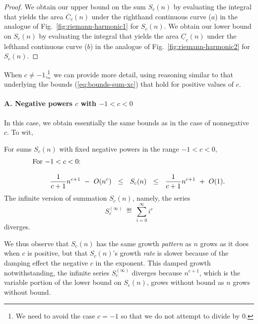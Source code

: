 \begin{proof}
We obtain our upper bound on the sum $S_c(n)$ by evaluating the
integral that yields the area $\overline{C}_c(n)$ under the righthand
continuous curve ($a$) in the analogue of
Fig.~\ref{fig:riemann-harmonic1} for $S_c(n)$.  We obtain our lower
bound on $S_c(n)$ by evaluating the integral that yields the area
$\underline{C}_c(n)$ under the lefthand continuous curve ($b$) in the
analogue of Fig.~\ref{fig:riemann-harmonic2} for $S_c(n)$.
\end{proof}

When $c \neq -1$,\footnote{We need to avoid the case $c = -1$ so that
  we do not attempt to divide by $0$.}~we can provide more detail,
using reasoning similar to that underlying the bounds
(\ref{eq:bounds-sum-xc}) that hold for positive values of $c$.

\paragraph{\sf A. Negative powers $c$ with $-1 < c < 0$}
In this case, we obtain essentially the same bounds as in the case of
nonnegative $c$.  To wit,

\begin{prop}
\label{thm:bounds-(-1)<c<0}
For sums $S_c(n)$ with fixed negative powers in the range $-1 < c<0$,
\begin{equation}
\label{eq:bounds-(-1)<c<0}
\begin{array}{l}
\mbox{For $-1 < c< 0$:} \\
 \\
\hspace*{.35in}
{\displaystyle \frac{1}{c+1} n^{c+1} \ - \ O(n^c)}
  \ \ \leq \ \ S_c(n)
  \ \ \leq \ \
{\displaystyle \frac{1}{c+1} n^{c+1} \ + \ O(1)}.
\end{array}
\end{equation}
The infinite version of summation $S_c(n)$, namely, the series
\[ S_c^{(\infty)} \ \eqdef \ \sum_{i=0}^\infty i^c \]
diverges.
\end{prop}

We thus observe that $S_c(n)$ has the same growth {\em pattern} as $n$
grows as it does when $c$ is positive, but that $S_c(n)$'s growth {\em
  rate} is slower because of the damping effect the negative $c$ in
the exponent.  This damped growth notwithstanding, the infinite series
$S_c^{(\infty)}$ diverges because $n^{c+1}$, which is the variable
portion of the lower bound on $S_c(n)$, grows without bound as $n$
grows without bound.

